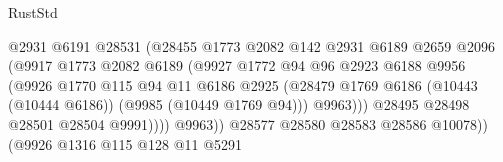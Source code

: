 \begin{lexlean}{RustStd}
\begin{coremodule}
                                          @2931
                                          @6191
                                          @28531
                                          (@28455
                                            @1773
                                            @2082
                                            @142
                                            @2931
                                            @6189
                                            @2659
                                            @2096
                                            (@9917
                                              @1773
                                              @2082
                                              @6189
                                              (@9927
                                                @1772
                                                @94
                                                @96
                                                @2923
                                                @6188
                                                @9956
                                                (@9926
                                                  @1770
                                                  @115
                                                  @94
                                                  @11
                                                  @6186
                                                  @2925
                                                  (@28479
                                                    @1769
                                                    @6186
                                                    (@10443 (@10444 @6186))
                                                    (@9985 (@10449 @1769 @94)))
                                                  @9963)))
                                            @28495
                                            @28498
                                            @28501
                                            @28504
                                            @9991))))
                                    @9963))
                                @28577
                                @28580
                                @28583
                                @28586
                                @10078))
                            (@9926
                              @1316
                              @115
                              @128
                              @11
                              @5291

\end{coremodule}
\end{lexlean}
